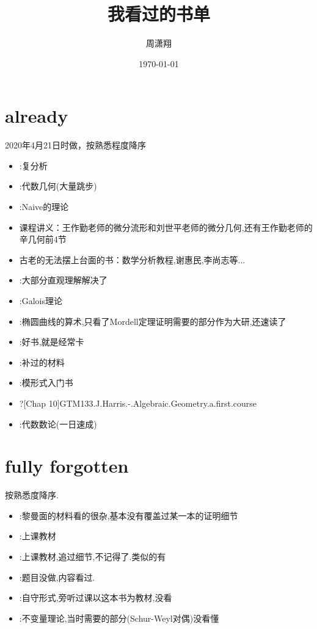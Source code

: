 \documentclass{ctexart}
\title{我看过的书单}
\date{\today}
\begin{document}
	\author{周潇翔}
\maketitle
\section{already}
2020年4月21日时做，按熟悉程度降序

\begin{itemize}
\item \cite[Chap 1-6]{ahlfors1979complex}:复分析
\item \cite[Chap 1-18.7]{vakil2017rising}:代数几何(大量跳步)
\item \cite{humphreys2012introduction}:Naive的理论
\item 课程讲义：王作勤老师的微分流形和刘世平老师的微分几何,还有王作勤老师的辛几何前4节
\item 古老的无法摆上台面的书：数学分析教程,谢惠民,李尚志等...
\item \cite{bott2013differential}:大部分直观理解解决了\\[0cm]
\item \cite[1-8]{morandi2012field}:Galois理论
\item \cite{tate1974the}:椭圆曲线的算术,只看了Mordell定理证明需要的部分作为大研,还速读了\cite{silverman1992rational}
\item \cite[Chap 1-5]{fermat2013dream}:好书,就是经常卡
\item \cite[Chap 1,2]{周蜀林2005PDE}:补过的材料
\item \cite[Chap 1-4,7,8]{Li2019modularform}:模形式入门书
\item ?[Chap 10]GTM133.J.Harris.-.Algebraic.Geometry.a.first.course
\item \cite[Chap 1-4]{冯克勤2000代数数论}:代数数论(一日速成)
\end{itemize}
\section{fully forgotten}
按熟悉度降序.
\begin{itemize}
	\item \cite{梅加强2000黎曼曲面讲义,forster2012lectures,springer1981introduction,anvari2009automorphisms}:黎曼面的材料看的很杂,基本没有覆盖过某一本的证明细节
	\item \cite[6]{alperin2012groups}:上课教材
	\item \cite[Chap 1-4,6]{陈亚浙1991}:上课教材,追过细节,不记得了.类似的有\cite{周蜀林2019Schauder}
	\item \cite{atiyah2018introduction}:题目没做,内容看过.\cite[1-5]{altman2013term}
	\item \cite{bump1998automorphic}:自守形式,旁听过课以这本书为教材,没看
	\item \cite{howe1995perspectives}:不变量理论,当时需要的部分(Schur-Weyl对偶)没看懂
\end{itemize}
\end{document}
